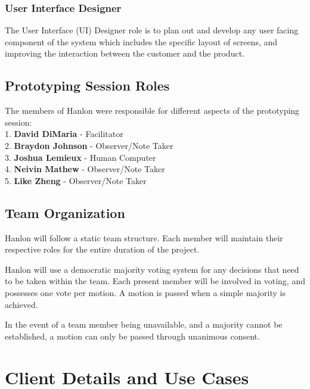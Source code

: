 \documentclass[12pt,letterpaper]{article}
\begin{document}
\subsubsection*{User Interface Designer}
The User Interface (UI) Designer role is to plan out and develop any user facing component of the system which includes the specific layout of screens, and improving the interaction between the customer and the product.

\subsection{Prototyping Session Roles}
The members of Hanlon were responsible for different aspects of the prototyping session:\\
1. \textbf{\hspace*{8pt}David DiMaria} - Facilitator\\
2. \textbf{\hspace*{8pt}Braydon Johnson} - Observer/Note Taker\\
3. \textbf{\hspace*{8pt}Joshua Lemieux} - Human Computer\\
4. \textbf{\hspace*{8pt}Neivin Mathew} - Observer/Note Taker\\
5. \textbf{\hspace*{8pt}Like Zheng} - Observer/Note Taker

\subsection{Team Organization}
Hanlon will follow a static team structure. Each member will maintain their respective roles for the entire duration of the project. \par

Hanlon will use a democratic majority voting system for any decisions that need to be taken within the team. Each present member will be involved in voting, and possesses one vote per motion. A motion is passed when a simple majority is achieved. \par

In the event of a team member being unavailable, and a majority cannot be established, a motion can only be passed through unanimous consent.

\clearpage
\section{Client Details and Use Cases}
\end{document}
